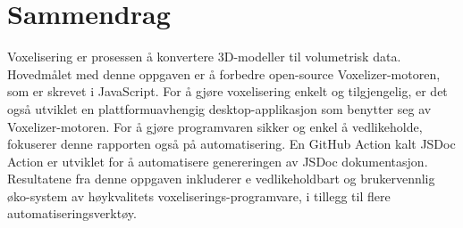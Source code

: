 \section*{Sammendrag}
Voxelisering er prosessen å konvertere 3D-modeller til volumetrisk data. Hovedmålet med denne oppgaven er å forbedre open-source Voxelizer-motoren, som er skrevet i JavaScript. For å gjøre voxelisering enkelt og tilgjengelig, er det også utviklet en plattformuavhengig desktop-applikasjon som benytter seg av Voxelizer-motoren. For å gjøre programvaren sikker og enkel å vedlikeholde, fokuserer denne rapporten også på automatisering. En GitHub Action kalt JSDoc Action er utviklet for å automatisere genereringen av JSDoc dokumentasjon. Resultatene fra denne oppgaven inkluderer e vedlikeholdbart og brukervennlig øko-system av høykvalitets voxeliserings-programvare, i tillegg til flere automatiseringsverktøy.

